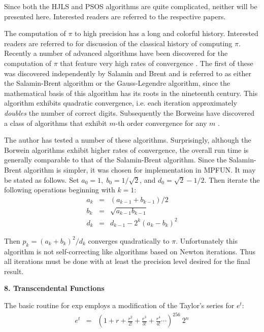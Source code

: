Since both the HJLS and PSOS algorithms are quite complicated, neither
will be presented here.  Interested readers are referred to the
respective papers.

\vspace{2ex}

The computation of $\pi$ to high precision has a long and colorful
history.  Interested readers are referred to \cite{beck} for
discussion of the classical history of computing $\pi$.  Recently a
number of advanced algorithms have been discovered for the computation
of $\pi$ that feature very high rates of convergence
\cite{borw2,borw3}.  The first of these was discovered independently
by Salamin \cite{salamin} and Brent \cite{brent1} and is referred to
as either the Salamin-Brent algorithm or the Gauss-Legendre algorithm,
since the mathematical basis of this algorithm has its roots in the
nineteenth century.  This algorithm exhibits quadratic convergence,
i.e. each iteration approximately {\it doubles} the number of correct
digits.  Subsequently the Borweins have discovered a class of
algorithms that exhibit $m$-th order convergence for any $m$
\cite{borw2,borw3}.

The author has tested a number of these algorithms.  Surprisingly,
although the Borwein algorithms exhibit higher rates of convergence,
the overall run time is generally comparable to that of the
Salamin-Brent algorithm.  Since the Salamin-Brent algorithm is
simpler, it was chosen for implementation in MPFUN.  It may be stated
as follows.  Set $a_0 = 1, \; b_0 = 1 / \sqrt{2}$, and $d_0 =
\sqrt{2} - 1/2$.  Then iterate the following operations beginning with
$k = 1$:
\begin{eqnarray*}
a_k &=& (a_{k-1} + b_{k-1}) / 2 \\
b_k &=& \sqrt{a_{k-1} b_{k-1}} \\
d_k &=& d_{k-1} - 2^k (a_k - b_k)^2
\end{eqnarray*}

\noindent
Then $p_k = (a_k + b_k)^2 / d_k$ converges quadratically to $\pi$.
Unfortunately this algorithm is not self-correcting like algorithms
based on Newton iterations.  Thus all iterations must be done with at
least the precision level desired for the final result.
 
\vspace{2ex} \noindent 
{\bf 8. Transcendental Functions}

The basic routine for exp employs a modification of the Taylor's
series for $e^t$:
\begin{eqnarray*}
e^t &=&  (1 + r + \frac{r^2}{2!} + \frac{r^3}{3!} +\frac{r^4}{4!}
   \cdots)^{256} \: 2^n
\end{eqnarray*}
 
